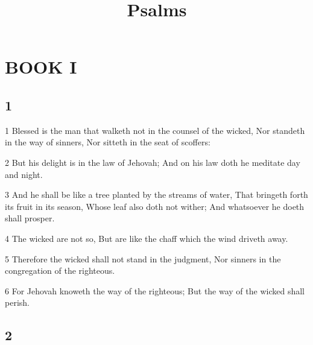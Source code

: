 

\title{Psalms}

\part{BOOK I}

\chapter{1}

\par 1 Blessed is the man that walketh not in the counsel of the wicked, Nor standeth in the way of sinners, Nor sitteth in the seat of scoffers:
\par 2 But his delight is in the law of Jehovah; And on his law doth he meditate day and night.
\par 3 And he shall be like a tree planted by the streams of water, That bringeth forth its fruit in its season, Whose leaf also doth not wither; And whatsoever he doeth shall prosper.
\par 4 The wicked are not so, But are like the chaff which the wind driveth away.
\par 5 Therefore the wicked shall not stand in the judgment, Nor sinners in the congregation of the righteous.
\par 6 For Jehovah knoweth the way of the righteous; But the way of the wicked shall perish.

\chapter{2}

